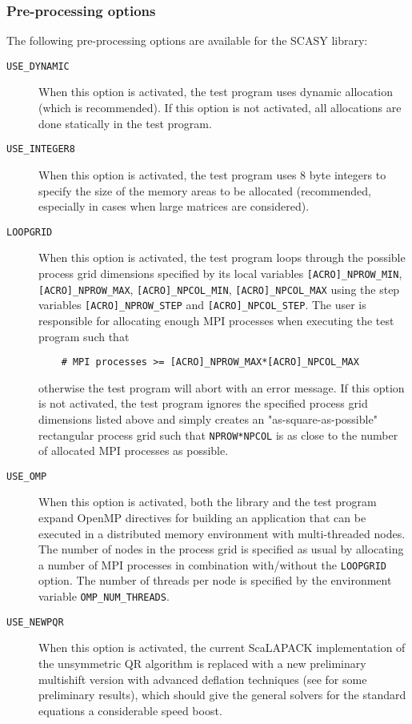 \documentclass[11pt]{article}
\begin{document}
\subsubsection{Pre-processing options}
\label{sec:preprocess} The following pre-processing options are
available for the SCASY library:
%
\begin{description}
    \item[\texttt{USE\_DYNAMIC}] When this option is activated, the test program uses dynamic
allocation (which is recommended). If this option is not
activated, all allocations are done statically in the test
program.

\item[\texttt{USE\_INTEGER8}] When this option is activated, the
test program uses 8 byte integers to specify the size of the
memory areas to be allocated (recommended, especially in cases
when large matrices are considered).

\item[\texttt{LOOPGRID}] When this option is activated, the test
program loops through the possible process grid dimensions
specified by its local variables \texttt{[ACRO]\_NPROW\_MIN},
\texttt{[ACRO]\_NPROW\_MAX}, \texttt{[ACRO]\_NPCOL\_MIN},
\texttt{[ACRO]\_NPCOL\_MAX} using the step variables
\texttt{[ACRO]\_NPROW\_STEP} and \texttt{[ACRO]\_NPCOL\_STEP}. The
user is responsible for allocating enough MPI processes when
executing the test program such that
\begin{verbatim}
    # MPI processes >= [ACRO]_NPROW_MAX*[ACRO]_NPCOL_MAX
\end{verbatim}
otherwise the test program will abort with an error message. If
this option is not activated, the test program ignores the
specified process grid dimensions listed above and simply creates
an "as-square-as-possible" rectangular process grid such that
\texttt{NPROW*NPCOL} is as close to the number of allocated MPI
processes as possible.

\item[\texttt{USE\_OMP}] When this option is activated, both the
library and the test program expand OpenMP directives for building
an application that can be executed in a distributed memory
environment with multi-threaded nodes. The number of nodes in the
process grid is specified as usual by allocating a number of MPI
processes in combination with/without the \texttt{LOOPGRID}
option. The number of threads per node is specified by the
environment variable \texttt{OMP\_NUM\_THREADS}.

\item[\texttt{USE\_NEWPQR}] When this option is activated, the
current ScaLAPACK implementation of the unsymmetric QR algorithm
is replaced with a new preliminary multishift version with
advanced deflation techniques (see \cite{granatkagstromkressner09}
for some preliminary results), which should give the general
solvers for the standard equations a considerable speed boost.


\end{description}
\end{document}
